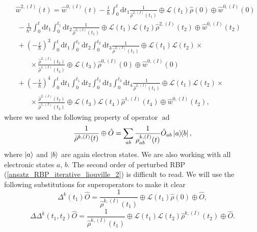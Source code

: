 \begin{equation}
\label{ansatz_RBP_iterative_liouville_2}
    \begin{aligned}
    &\hat{w}^{2,(I)}(t) = \hat{w}^{0, (I)}(t) - \frac{i}{\hbar}\int_{0}^{t} \mathrm{d} t_1 \frac{1}{\hat{\rho}^{2, (I)}(t_1)} \oplus \mathcal{L}(t_1) \hat{\rho}(0) \oplus \hat{w}^{0, (I)}(0)  \\
     &\: -\frac{1}{\hbar^2} \int_{0}^{t} \mathrm{d} t_1 \int_{0}^{t_1} \mathrm{d} t_2 \frac{1}{\hat{\rho}^{2, (I)}(t_1)} \oplus \mathcal{L}(t_1) \mathcal{L}(t_2) \hat{\rho}^{2, (I)}(t_2) \oplus \hat{w}^{0, (I)}(t_2)\\
     &\: +\left(-\frac{i}{\hbar}\right)^3 \int_{0}^{t} \mathrm{d} t_1 \int_{0}^{t_1} \mathrm{d} t_2 \int_{0}^{t_2} \mathrm{d} t_3 \frac{1}{\hat{\rho}^{2, (I)}(t_1)} \oplus \mathcal{L}(t_1) \mathcal{L}(t_2) \times \\
     & \quad \quad \times\frac{\hat{\rho}^{2, (I)}(t_2)}{\hat{\rho}^{1, (I)}(t_3)} \oplus \mathcal{L}(t_3) \hat{\rho}^{0, (I)}(0) \oplus \hat{w}^{0, (I)}(0) \\
     &\: +\left(-\frac{i}{\hbar}\right)^4 \int_{0}^{t} \mathrm{d} t_1 \int_{0}^{t_1} \mathrm{d} t_2 \int_{0}^{t_2} \mathrm{d} t_3 \int_{0}^{t_3} \mathrm{d} t_4 \frac{1}{\hat{\rho}^{2, (I)}(t_1)} \oplus \mathcal{L}(t_1) \mathcal{L}(t_2) \times \\
     & \quad \quad \times\frac{\hat{\rho}^{2, (I)}(t_2)}{\hat{\rho}^{1, (I)}(t_3)} \oplus \mathcal{L}(t_3) \mathcal{L}(t_4) \hat{\rho}^{1, (I)}(t_4) \oplus \hat{w}^{0, (I)}(t_2),
    \end{aligned}
\end{equation}
where we used the following property of operator $\operatorname{ad}$
\begin{equation}
    \frac{1}{\hat{\rho}^{k, (I)}(t)} \oplus \hat{O} = \sum_{ab} \frac{1}{\rho^{k, (I)}_{ab}(t)} \hat{O}_{ab} \ketbra{a}{b},
\end{equation}
where $\ket{a}$ and $\ket{b}$ are again electron states. We are also working with all electronic states $a$, $b$. The second order of perturbed RBP (\ref{ansatz_RBP_iterative_liouville_2}) is difficult to read. We will use the following substitutions for superoperators to make it clear
\begin{equation}
    \Delta^{k}(t_1) \hat{O} = \frac{1}{\hat{\rho}^{k, (I)}(t_1)} \oplus \mathcal{L}(t_1) \hat{\rho}(0) \oplus \hat{O},
\end{equation}
\begin{equation}
    \Delta\Delta^{k}(t_1, t_2) \hat{O} = \frac{1}{\hat{\rho}^{k, (I)}(t_1)} \oplus \mathcal{L}(t_1) \mathcal{L}(t_2) \hat{\rho}^{k, (I)}(t_2) \oplus \hat{O} .
\end{equation}
